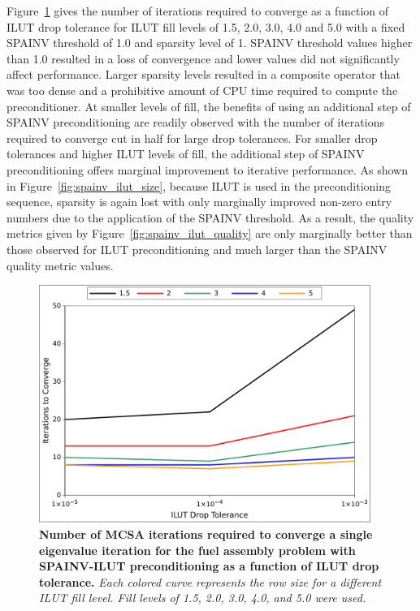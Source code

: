 Figure~\ref{fig:spainv_ilut_iterations} gives the number of iterations
required to converge as a function of ILUT drop tolerance for ILUT
fill levels of 1.5, 2.0, 3.0, 4.0 and 5.0 with a fixed SPAINV
threshold of 1.0 and sparsity level of 1. SPAINV threshold values
higher than 1.0 resulted in a loss of convergence and lower values did
not significantly affect performance. Larger sparsity levels resulted
in a composite operator that was too dense and a prohibitive amount of
CPU time required to compute the preconditioner. At smaller levels of
fill, the benefits of using an additional step of SPAINV
preconditioning are readily observed with the number of iterations
required to converge cut in half for large drop tolerances. For
smaller drop tolerances and higher ILUT levels of fill, the additional
step of SPAINV preconditioning offers marginal improvement to
iterative performance. As shown in Figure~\ref{fig:spainv_ilut_size},
because ILUT is used in the preconditioning sequence, sparsity is
again lost with only marginally improved non-zero entry numbers due to
the application of the SPAINV threshold. As a result, the quality
metrics given by Figure~\ref{fig:spainv_ilut_quality} are only
marginally better than those observed for ILUT preconditioning and
much larger than the SPAINV quality metric values.
\begin{figure}[t!]
  \begin{center}
    \includegraphics[width=4.25in]{chapters/spn_equations/psilut_iterations.pdf}
  \end{center}
  \caption{\textbf{Number of MCSA iterations required to converge a
      single eigenvalue iteration for the fuel assembly problem with
      SPAINV-ILUT preconditioning as a function of ILUT drop
      tolerance.} \textit{Each colored curve represents the row size
      for a different ILUT fill level. Fill levels of 1.5, 2.0, 3.0,
      4.0, and 5.0 were used.}}
  \label{fig:spainv_ilut_iterations}
\end{figure}

